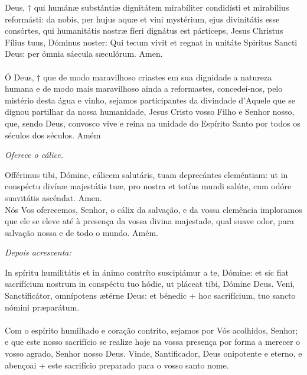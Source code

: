 \begin{multicols}{2}
	\noindent Deus, $\dagger$ qui humánæ substántiæ dignitátem mirabíliter condidísti et mirabílius reformásti: da nobis, per hujus aquæ et vini mystérium, ejus divinitátis esse consórtes, qui humanitátis nostræ fíeri dignátus est párticeps, Jesus Christus Fílius tuus, Dóminus noster: Qui tecum vivit et regnat in unitáte Spiritus Sancti Deus: per ómnia sáecula sæculórum. Amen. 
	\\
	\\Ó Deus, $\dagger$ que de modo maravilhoso criastes em sua dignidade a natureza humana e de modo mais maravilhoso ainda a reformastes, concedei-nos, pelo mistério desta água e vinho, sejamos participantes da divindade d’Aquele que se dignou partilhar da nossa humanidade, Jesus Cristo vosso Filho e Senhor nosso, que, sendo Deus, convosco vive e reina na unidade do Espírito Santo por todos os séculos dos séculos. Amém
\end{multicols}

\begin{flushleft}
	\textit{Oferece o cálice.}
\end{flushleft}

\begin{multicols}{2}
	\noindent Offérimus tibi, Dómine, cálicem salutáris, tuam deprecántes cleméntiam: ut in conspéctu divínæ majestátis tuæ, pro nostra et totíus mundi salúte, cum odóre suavitátis ascéndat. Amen. 
	\\ Nós Vos oferecemos, Senhor, o cálix da salvação, e da vossa clemência imploramos que ele se eleve até à presença da vossa divina majestade, qual suave odor, para salvação nossa e de todo o mundo. Amém.
\end{multicols}

\begin{flushleft}
	\textit{Depois acrescenta:}
\end{flushleft}

\begin{multicols}{2}
\noindent In spíritu humilitátis et in ánimo contríto suscipiámur a te, Dómine: et sic fiat sacrifícium nostrum in conspéctu tuo hódie, ut pláceat tibi, Dómine Deus. Veni, Sanctificátor, omnípotens ætérne Deus: et bénedic + hoc sacrifícium, tuo sancto nómini præparátum. 
\\
\\ Com o espírito humilhado e coração contrito, sejamos por Vós acolhidos, Senhor; e que este nosso sacrifício se realize hoje na vossa presença por forma a merecer o vosso agrado, Senhor nosso Deus.
Vinde, Santificador, Deus onipotente e eterno, e abençoai + este sacrifício preparado para o vosso santo nome.
\end{multicols}

